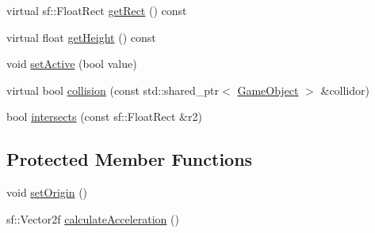\begin{DoxyCompactItemize}
virtual sf\+::\+Float\+Rect \hyperlink{class_game_object_aecc23e1558ae04e10083deae74774bd2}{get\+Rect} () const
\item 
virtual float \hyperlink{class_game_object_a927400453a0989e2f5b765031f4d861c}{get\+Height} () const
\item 
void \hyperlink{class_game_object_a69049f93009eb35751e5088284d18247}{set\+Active} (bool value)
\item 
virtual bool \hyperlink{class_game_object_a56a330813f51b91b2ad8aacb42b6d8ea}{collision} (const std\+::shared\+\_\+ptr$<$ \hyperlink{class_game_object}{Game\+Object} $>$ \&collidor)
\item 
bool \hyperlink{class_game_object_a7c189644b6b5810c117a4e2654fbc752}{intersects} (const sf\+::\+Float\+Rect \&r2)
\end{DoxyCompactItemize}
\subsection*{Protected Member Functions}
\begin{DoxyCompactItemize}
\item 
void \hyperlink{class_game_object_a939b26e569a42ec129e57540920e859c}{set\+Origin} ()
\item 
sf\+::\+Vector2f \hyperlink{class_game_object_a353ce0e2b43911b153f1b917cefaa45e}{calculate\+Acceleration} ()
\end{DoxyCompactItemize}
